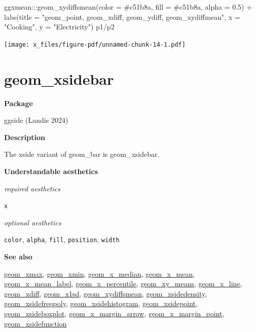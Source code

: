 \documentclass[
  letterpaper,
  DIV=11,
  numbers=noendperiod]{scrreprt}
\newenvironment{Shaded}{\begin{snugshade}}{\end{snugshade}}
\newcommand{\AttributeTok}[1]{\textcolor[rgb]{0.40,0.45,0.13}{#1}}
\newcommand{\FloatTok}[1]{\textcolor[rgb]{0.68,0.00,0.00}{#1}}
\newcommand{\FunctionTok}[1]{\textcolor[rgb]{0.28,0.35,0.67}{#1}}
\newcommand{\NormalTok}[1]{\textcolor[rgb]{0.00,0.23,0.31}{#1}}
\newcommand{\SpecialCharTok}[1]{\textcolor[rgb]{0.37,0.37,0.37}{#1}}
\newcommand{\StringTok}[1]{\textcolor[rgb]{0.13,0.47,0.30}{#1}}
\begin{document}
\begin{Shaded}
\begin{Highlighting}[]
\NormalTok{  ggxmean}\SpecialCharTok{:::}\FunctionTok{geom\_xydiffsmean}\NormalTok{(}\AttributeTok{color =} \StringTok{\textquotesingle{}\#c51b8a\textquotesingle{}}\NormalTok{, }\AttributeTok{fill =} \StringTok{\textquotesingle{}\#c51b8a\textquotesingle{}}\NormalTok{, }\AttributeTok{alpha =} \FloatTok{0.5}\NormalTok{) }\SpecialCharTok{+}
  \FunctionTok{labs}\NormalTok{(}\AttributeTok{title =} \StringTok{"geom\_point, geom\_xdiff, geom\_ydiff, geom\_xydiffmean"}\NormalTok{, }\AttributeTok{x =} \StringTok{"Cooking"}\NormalTok{, }\AttributeTok{y =} \StringTok{"Electricity"}\NormalTok{) }
\NormalTok{p1}\SpecialCharTok{/}\NormalTok{p2}
\end{Highlighting}
\end{Shaded}

\texttt{[image: x\_files/figure-pdf/unnamed-chunk-14-1.pdf]}

\section{geom\_xsidebar}\label{xsidebar}

\textbf{Package}

ggside (Landis 2024)

\textbf{Description}

The xside variant of geom\_bar is geom\_xsidebar.

\textbf{Understandable aesthetics}

\emph{required aesthetics}

\texttt{x}

\emph{optional aesthetics}

\texttt{color}, \texttt{alpha}, \texttt{fill}, \texttt{position},
\texttt{width}

\textbf{See also}

\href{@xmax}{geom\_xmax}, \href{@xmin}{geom\_xmin},
\href{@x_median}{geom\_x\_median}, \href{@x_mean}{geom\_x\_mean},
\href{@x_mean_label}{geom\_x\_mean\_label},
\href{@x_percentile}{geom\_x\_percentile},
\href{@xy_means}{geom\_xy\_means}, \href{@x_line}{geom\_x\_line},
\href{@xdiff}{geom\_xdiff}, \href{@x1sd}{geom\_x1sd},
\href{@xydiffsmean}{geom\_xydiffsmean},
\href{@xsidedensity}{geom\_xsidedensity},
\href{@xsidefreqpoly}{geom\_xsidefreqpoly},
\href{@xsidehistogram}{geom\_xsidehistogram},
\href{@xsidepoint}{geom\_xsidepoint},
\href{@xsideboxplot}{geom\_xsideboxplot},
\href{@x_margin_arrow}{geom\_x\_margin\_arrow},
\href{@x_margin_point}{geom\_x\_margin\_point},
\href{@xsidefunction}{geom\_xsidefunction}
\end{document}
